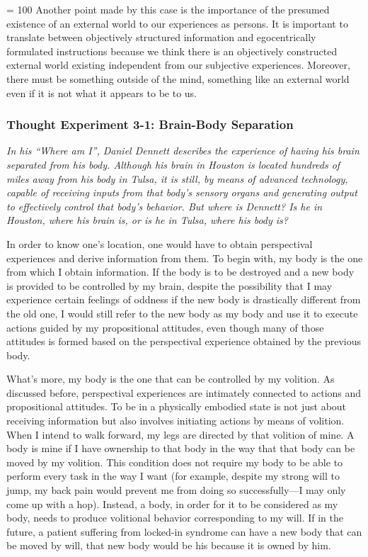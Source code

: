 \pretolerance = 100
Another point made by this case is the importance of the presumed
existence of an external world to our experiences as persons. 
It is
important to translate between objectively structured information and
egocentrically formulated instructions because we think there is an
objectively constructed external world existing independent from our
subjective experiences. Moreover, there must be something outside of the
mind, something like an external world even if it is not what it appears
to be to us.

\subsubsection*{Thought Experiment 3-1: Brain-Body Separation}

\emph{In his ``Where am I'', Daniel Dennett describes the experience of
having his brain separated from his body. Although his brain in Houston
is located hundreds of miles away from his body in Tulsa, it is still,
by means of advanced technology, capable of receiving inputs from that
body's sensory organs and generating output to effectively control that
body's behavior. But where is Dennett? Is he in Houston, where his brain
is, or is he in Tulsa, where his body is?}
\vspace{1em}

In order to know one's location, one would have to obtain perspectival
experiences and derive information from them. To begin with, my body is
the one from which I obtain information. If the body is to be destroyed
and a new body is provided to be controlled by my brain, despite the
possibility that I may experience certain feelings of oddness if the new
body is drastically different from the old one, I would still refer to
the new body as my body and use it to execute actions guided by my
propositional attitudes, even though many of those attitudes is formed
based on the perspectival experience obtained by the previous body.

What's more, my body is the one that can be controlled by my volition.
As discussed before, perspectival experiences are intimately connected
to actions and propositional attitudes. To be in a physically embodied
state is not just about receiving information but also involves
initiating actions by means of volition. When I intend to walk forward,
my legs are directed by that volition of mine. A body is mine if I have
ownership to that body in the way that that body can be moved by my
volition. This condition does not require my body to be able to perform
every task in the way I want (for example, despite my strong will to
jump, my back pain would prevent me from doing so successfully---I may
only come up with a hop). Instead, a body, in order for it to be
considered as my body, needs to produce volitional behavior
corresponding to my will. If in the future, a patient suffering from
locked-in syndrome can have a new body that can be moved by will, that
new body would be his because it is owned by him.

